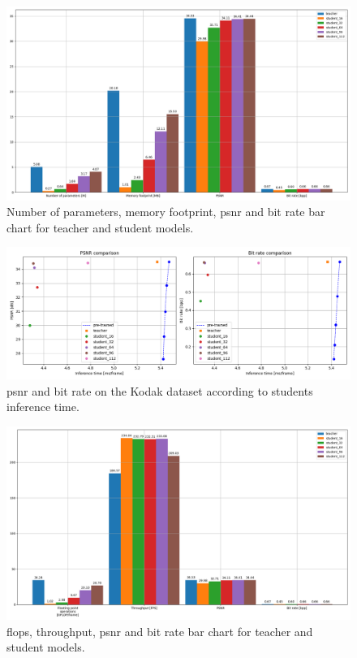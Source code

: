 \begin{figure}
    \centering
    \includegraphics[width=15cm]{../img/kd_lic_bar_size.png}
    \caption[Number of parameters, memory footprint, \acrshort{psnr} and bit rate bar chart for teacher and student models.]{Number of parameters, memory footprint, \acrshort{psnr} and bit rate bar chart for teacher and student models.}
    \label{appendix:kd_lic_bar_size}
\end{figure}

\begin{figure}
    \centering
    \includegraphics[width=15cm]{../img/kd_lic_time.png}
    \caption[\acrshort{psnr} and bit rate on the Kodak dataset according to students inference time.]{\acrshort{psnr} and bit rate on the Kodak dataset according to students inference time.}
    \label{appendix:kd_lic_time}
\end{figure}

\begin{figure}
    \centering
    \includegraphics[width=15cm]{../img/kd_lic_bar_compute.png}
    \caption[\acrshort{flop}s, throughput, \acrshort{psnr} and bit rate bar chart for teacher and student models.]{\acrshort{flop}s, throughput, \acrshort{psnr} and bit rate bar chart for teacher and student models.}
    \label{appendix:kd_lic_bar_compute}
\end{figure}

